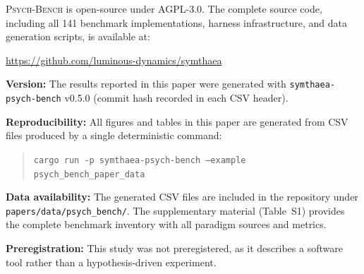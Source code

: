 \documentclass[11pt,letterpaper]{article}
\newcommand{\psychbench}{\textsc{Psych-Bench}}
\begin{document}
\psychbench{} is open-source under AGPL-3.0. The complete source code, including all 141 benchmark implementations, harness infrastructure, and data generation scripts, is available at:

\begin{center}
\url{https://github.com/luminous-dynamics/symthaea}
\end{center}

\noindent\textbf{Version:} The results reported in this paper were generated with \texttt{symthaea-psych-bench} v0.5.0 (commit hash recorded in each CSV header).

\noindent\textbf{Reproducibility:} All figures and tables in this paper are generated from CSV files produced by a single deterministic command:
\begin{quote}
\texttt{cargo run -p symthaea-psych-bench --example psych\_bench\_paper\_data}
\end{quote}

\noindent\textbf{Data availability:} The generated CSV files are included in the repository under \texttt{papers/\allowbreak{}data/\allowbreak{}psych\_bench/}. The supplementary material (Table~S1) provides the complete benchmark inventory with all paradigm sources and metrics.

\noindent\textbf{Preregistration:} This study was not preregistered, as it describes a software tool rather than a hypothesis-driven experiment.



\end{document}
